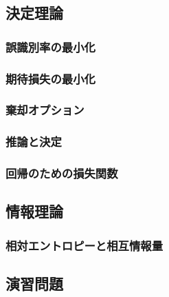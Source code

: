 \documentclass[uplatex,a4paper,oneside,openany,dvipdfmx]{jsarticle}
\numberwithin{equation}{section}
\theoremstyle{mystyle} %
\begin{document}
\subsection{決定理論} \label{subsec:decision_theory}

\subsubsection{誤識別率の最小化}

\subsubsection{期待損失の最小化}

\subsubsection{棄却オプション}

\subsubsection{推論と決定}

\subsubsection{回帰のための損失関数}

\subsection{情報理論}

\subsubsection{相対エントロピーと相互情報量}

\subsection{演習問題}
\end{document}
